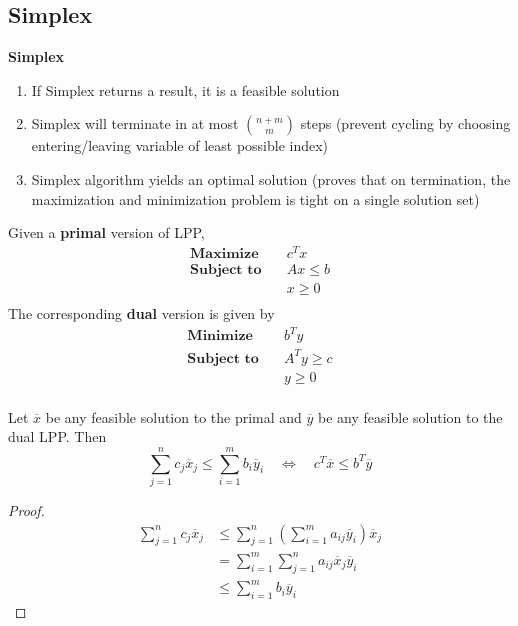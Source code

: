\documentclass[11pt]{article}
\begin{document}
\subsection*{Simplex}

\begin{proposition*}    
    \textbf{Simplex}
    \begin{enumerate}
        \item If Simplex returns a result, it is a feasible solution 
        \item Simplex will terminate in at most $\binom{n+m}{m}$ steps (prevent cycling by choosing entering/leaving variable of least possible index)
        \item Simplex algorithm yields an optimal solution (proves that on termination, the maximization and minimization problem is tight on a single solution set)
    \end{enumerate}
\end{proposition*}

\begin{defn*}
    \textbf{} Given a \textbf{primal} version of LPP, 
    \begin{align*}
        \textbf{Maximize} \quad & c^T x \\
        \textbf{Subject to} \quad & Ax \leq b \\
                                & x \geq 0 \\
    \end{align*}
    The corresponding \textbf{dual} version is given by 
    \begin{align*}
        \textbf{Minimize} \quad & b^T y \\
        \textbf{Subject to} \quad & A^T y \geq c \\
                                & y \geq 0 \\
    \end{align*}
\end{defn*}



\begin{lemma*}
    Let $\overline{x}$ be any feasible solution to the primal and $\overline{y}$ be any feasible solution to the dual LPP. Then 
    \[
        \sum_{j=1}^n c_j \overline{x}_j \leq \sum_{i=1}^m b_i \overline{y}_i \quad \iff \quad c^T \overline{x} \leq b^T \overline{y}
    \]
    \begin{proof}
        \begin{align*}
            \sum_{j=1}^n c_j \overline{x}_j &\leq \sum_{j=1}^n \left( \sum_{i=1}^m a_{ij} \overline{y}_i \right) \overline{x}_j \\
            &= \sum_{i=1}^m \sum_{j=1}^n a_{ij} \overline{x}_j \overline{y}_i \\ 
            &\leq \sum_{i=1}^m b_i \overline{y}_i
        \end{align*}
    \end{proof}
\end{lemma*}
\end{document}
